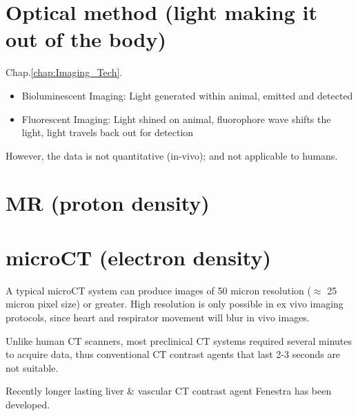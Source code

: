 \section{Optical method (light making it out of the body)}

Chap.\ref{chap:Imaging_Tech}.
\begin{itemize}
  \item Bioluminescent Imaging: Light generated within animal, emitted and detected

  \item Fluorescent Imaging: Light shined on animal, fluorophore wave shifts the light, 
light travels back out for detection
\end{itemize}

However, the data is not quantitative (in-vivo); and not applicable to humans.


\section{MR (proton density)}
\section{microCT (electron density)}
\label{sec:microCT}

A typical microCT system can produce images of 50 micron resolution ($\approx$ 25
micron pixel size) or greater.
High resolution is only possible in ex vivo imaging protocols, since heart and
respirator movement will blur in vivo images.

Unlike human CT scanners, most preclinical CT systems required several 
minutes to acquire data, thus conventional CT contrast agents that last 2-3 
seconds are not suitable.

Recently longer lasting liver \& vascular CT contrast agent Fenestra has been
developed.



